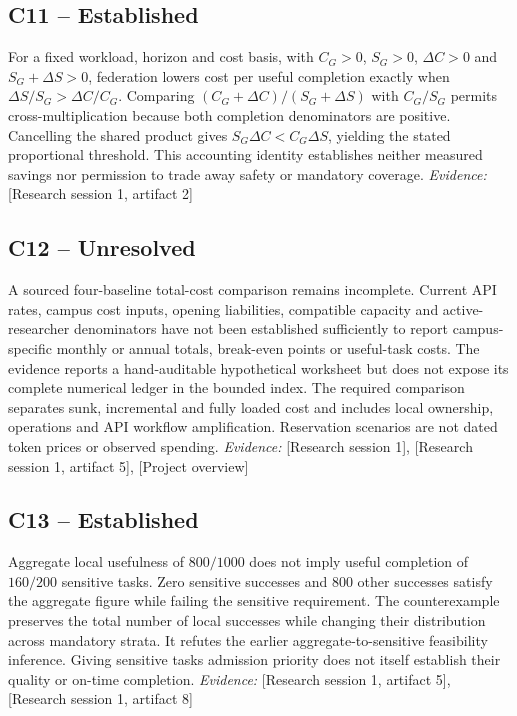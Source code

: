 \documentclass[11pt]{article}
\begin{document}
\subsection{C11 -- Established}
For a fixed workload, horizon and cost basis, with $C_G>0$, $S_G>0$, $\Delta C>0$ and $S_G+\Delta S>0$, federation lowers cost per useful completion exactly when $\Delta S/S_G>\Delta C/C_G$.
Comparing $(C_G+\Delta C)/(S_G+\Delta S)$ with $C_G/S_G$ permits cross-multiplication because both completion denominators are positive. Cancelling the shared product gives $S_G\Delta C<C_G\Delta S$, yielding the stated proportional threshold. This accounting identity establishes neither measured savings nor permission to trade away safety or mandatory coverage.
\textit{Evidence: }[Research session 1, artifact 2]
\subsection{C12 -- Unresolved}
A sourced four-baseline total-cost comparison remains incomplete. Current API rates, campus cost inputs, opening liabilities, compatible capacity and active-researcher denominators have not been established sufficiently to report campus-specific monthly or annual totals, break-even points or useful-task costs.
The evidence reports a hand-auditable hypothetical worksheet but does not expose its complete numerical ledger in the bounded index. The required comparison separates sunk, incremental and fully loaded cost and includes local ownership, operations and API workflow amplification. Reservation scenarios are not dated token prices or observed spending.
\textit{Evidence: }[Research session 1], [Research session 1, artifact 5], [Project overview]
\subsection{C13 -- Established}
Aggregate local usefulness of $800/1000$ does not imply useful completion of $160/200$ sensitive tasks. Zero sensitive successes and $800$ other successes satisfy the aggregate figure while failing the sensitive requirement.
The counterexample preserves the total number of local successes while changing their distribution across mandatory strata. It refutes the earlier aggregate-to-sensitive feasibility inference. Giving sensitive tasks admission priority does not itself establish their quality or on-time completion.
\textit{Evidence: }[Research session 1, artifact 5], [Research session 1, artifact 8]
\end{document}
